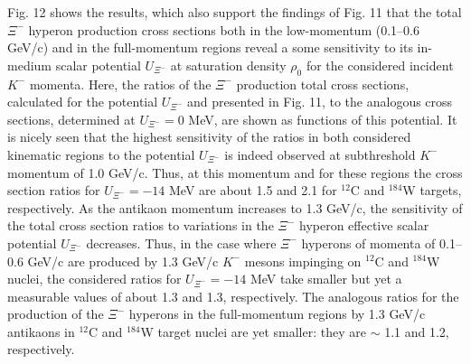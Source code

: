\documentclass[12pt]{article}
\begin{document}
Fig. 12 shows the results, which also support
the findings of Fig. 11 that the total $\Xi^-$ hyperon production cross sections
both in the low-momentum (0.1--0.6 GeV/c) and in the full-momentum regions reveal
a some sensitivity to its in-medium scalar potential $U_{\Xi^-}$ at saturation density $\rho_0$
for the considered incident $K^-$ momenta.
Here, the ratios of the $\Xi^-$ production total cross sections, calculated for the
potential $U_{\Xi^-}$ and presented in Fig. 11, to the analogous cross sections,
determined at $U_{\Xi^-}=0$ MeV, are shown as functions of this potential.
It is nicely seen that the highest sensitivity of the ratios in
both considered kinematic regions to the potential $U_{\Xi^-}$ is indeed observed at
subthreshold $K^-$ momentum of 1.0 GeV/c.
Thus, at this momentum and for these regions the cross section ratios for $U_{\Xi^-}=-14$ MeV
are about 1.5 and 2.1 for $^{12}$C and $^{184}$W targets, respectively.
As the antikaon momentum increases to 1.3 GeV/c, the sensitivity of the total cross section
ratios to variations in the $\Xi^-$ hyperon effective scalar potential $U_{\Xi^-}$ decreases.
Thus, in the case where $\Xi^-$ hyperons of
momenta of 0.1--0.6 GeV/c are produced by 1.3 GeV/c $K^-$ mesons impinging on $^{12}$C and $^{184}$W
nuclei, the considered ratios for $U_{\Xi^-}=-14$ MeV take smaller but yet a measurable values of about 1.3
and 1.3, respectively. The analogous ratios for the production of the $\Xi^-$ hyperons
in the full-momentum regions by 1.3 GeV/c antikaons in $^{12}$C and $^{184}$W target nuclei are
yet smaller: they are $\sim$ 1.1 and 1.2, respectively.
\end{document}
